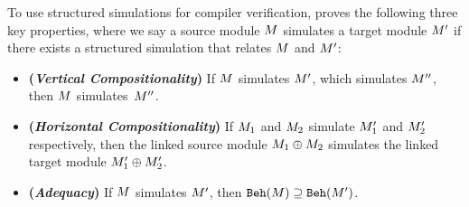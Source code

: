 To use structured simulations for compiler verification, \ccc{} proves
the following three key properties, where we say a source module
$M$ simulates a target module $M'$ if there exists a
structured simulation that relates $M$ and $M'$:
\begin{itemize}
\item \textbf{(\emph{Vertical Compositionality})}
  If $M$ simulates $M'$, which simulates $M''$,
  then $M$ simulates~$M''$.
\item \textbf{(\emph{Horizontal Compositionality})}
  If $M_1$ and $M_2$ simulate
     $M'_1$ and $M'_2$ respectively,
  then the linked source module  $M_1 \oplus M_2$ simulates
  the linked target module $M'_1 \oplus M'_2$.
\item \textbf{(\emph{Adequacy})}
  If $M$ simulates $M'$,
  then $\mathtt{Beh}({M}) \supseteq \mathtt{Beh}({M'})$.
\end{itemize}
